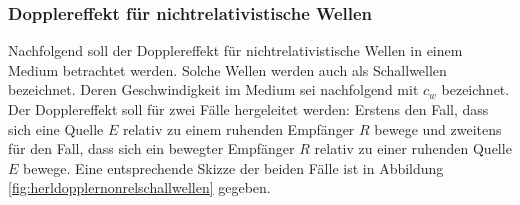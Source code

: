 \documentclass[a4paper,12pt]{article}
\numberwithin{equation}{section}
\begin{document}
\subsubsection{Dopplereffekt für nichtrelativistische Wellen}
Nachfolgend soll der Dopplereffekt für nichtrelativistische Wellen in einem Medium betrachtet werden. Solche Wellen werden auch als Schallwellen bezeichnet. Deren Geschwindigkeit im Medium sei nachfolgend mit $c_w$ bezeichnet. Der Dopplereffekt soll für zwei Fälle hergeleitet werden: Erstens den Fall, dass sich eine Quelle $E$ relativ zu einem ruhenden Empfänger $R$ bewege und zweitens für den Fall, dass sich ein bewegter Empfänger $R$ relativ zu einer ruhenden Quelle $E$ bewege. Eine entsprechende Skizze der beiden Fälle ist in Abbildung \ref{fig:herldopplernonrelschallwellen} gegeben.
\begin{figure}[h]
\centering



\begin{tikzpicture}[x=0.75pt,y=0.75pt,yscale=-1,xscale=1]


\end{tikzpicture}
\end{figure}
\end{document}

